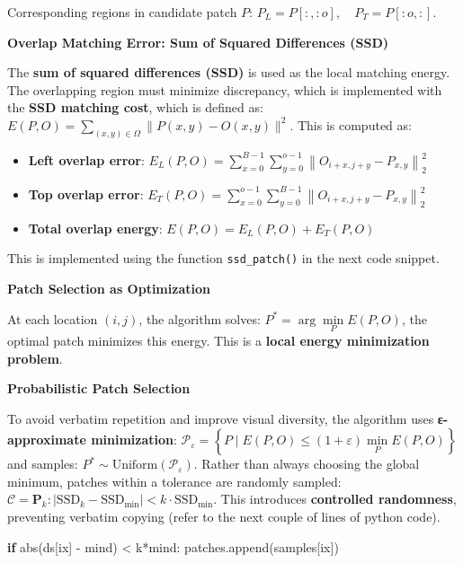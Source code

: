 \documentclass[11pt]{article}
\providecommand{\tightlist}{%
      \setlength{\itemsep}{0pt}\setlength{\parskip}{0pt}}
\newenvironment{Shaded}{}{}
\newcommand{\NormalTok}[1]{{#1}}
\newcommand{\ControlFlowTok}[1]{\textcolor[rgb]{0.00,0.44,0.13}{\textbf{{#1}}}}
\newcommand{\OperatorTok}[1]{\textcolor[rgb]{0.40,0.40,0.40}{{#1}}}
\newcommand{\BuiltInTok}[1]{{#1}}
\begin{document}
Corresponding regions in candidate patch \(P\):
\(P_L = P[:, :o], \quad P_T = P[:o, :]\).

\textbf{Overlap Matching Error: Sum of Squared Differences (SSD)}

The \textbf{sum of squared differences (SSD)} is used as the local
matching energy. The overlapping region must minimize discrepancy, which
is implemented with the \textbf{SSD matching cost}, which is defined as:
\(E(P, O) = \sum\limits_{(x, y) \in \Omega} \| P(x, y) - O(x, y) \|^2\).
This is computed as:

\begin{itemize}
\tightlist
\item
  \textbf{Left overlap error}:
  \(E_L(P, O) = \sum\limits_{x=0}^{B-1} \sum\limits_{y=0}^{o-1} \left\| O_{i+x, j+y} - P_{x,y} \right\|_2^2\)
\item
  \textbf{Top overlap error}:
  \(E_T(P, O) = \sum\limits_{x=0}^{o-1} \sum\limits_{y=0}^{B-1} \left\| O_{i+x, j+y} - P_{x,y} \right\|_2^2\)
\item
  \textbf{Total overlap energy}:
  \(\boxed{E(P, O) = E_L(P, O) + E_T(P, O)}\)
\end{itemize}

This is implemented using the function \texttt{ssd\_patch()} in the next
code snippet.

\textbf{Patch Selection as Optimization}

At each location \((i,j)\), the algorithm solves:
\(\boxed{P^* = \arg \underset{P}{\min}E(P, O)}\), the optimal patch
minimizes this energy. This is a \textbf{local energy minimization
problem}.

\textbf{Probabilistic Patch Selection}

To avoid verbatim repetition and improve visual diversity, the algorithm
uses \textbf{ε-approximate minimization}:
\(\mathcal{P}_\varepsilon=\left\{P \mid E(P,O) \le (1+\varepsilon)\underset{P}{\min}E(P,O)\right\}\)
and samples: \(P^* \sim \text{Uniform}(\mathcal{P}_\varepsilon)\).
Rather than always choosing the global minimum, patches within a
tolerance are randomly sampled:
\(\mathcal{C} = { \mathbf{P}_k : | \text{SSD}_k - \text{SSD}_{\min} | < k \cdot \text{SSD}_{\min} }\).
This introduces \textbf{controlled randomness}, preventing verbatim
copying (refer to the next couple of lines of python code).

\begin{Shaded}
\begin{Highlighting}[]
\ControlFlowTok{if} \BuiltInTok{abs}\NormalTok{(ds[ix] }\OperatorTok{{-}}\NormalTok{ mind) }\OperatorTok{\textless{}}\NormalTok{ k}\OperatorTok{*}\NormalTok{mind:}
\NormalTok{    patches.append(samples[ix])}
\end{Highlighting}
\end{Shaded}
\end{document}
